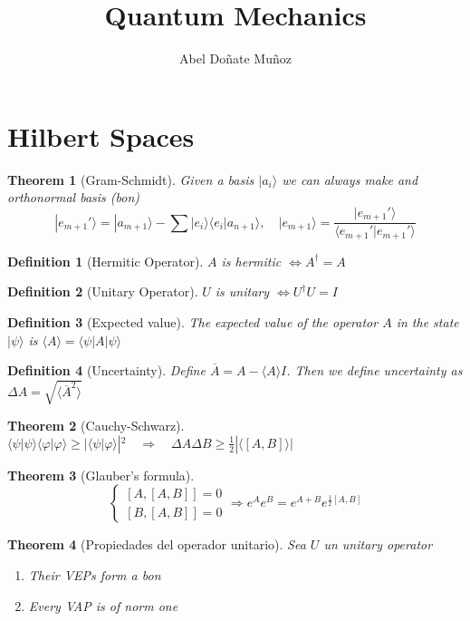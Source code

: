 \documentclass[leqno]{article}
\title{Quantum Mechanics}
\author{Abel Doñate Muñoz}
\date{}
\newtheorem*{theorem}{Theorem}
\newtheorem*{definition}{Definition}
\begin{document}
\maketitle
\tableofcontents
\newpage

\section{Hilbert Spaces}
\begin{theorem}[Gram-Schmidt]
Given a basis $| a_i \rangle $ we can always make and orthonormal basis (bon)
\[
| e_{m+1}' \rangle = | a_{m+1} \rangle - \sum | e_i \rangle \langle e_i | a_{n+1} \rangle  , \quad | e_{m+1} \rangle = \frac{| e_{m+1}' \rangle }{\langle e_{m+1}' | e_{m+1}' \rangle } 
\] 
\end{theorem}

\begin{definition}[Hermitic Operator] $A$ is hermitic  $\iff A^\dagger = A	$
\end{definition}
\begin{definition}[Unitary Operator] $U$ is unitary  $\iff U^\dagger U = I$
\end{definition}
\begin{definition}[Expected value] The expected value of the operator $A$ in the state $| \psi \rangle $ is $\langle A \rangle = \langle \psi  | A | \psi  \rangle     $
\end{definition}
\begin{definition}[Uncertainty] Define $\overline{A}=A-\langle A  \rangle I $. Then we define uncertainty as $\Delta A = \sqrt{\langle \overline{A}^2 \rangle } $
\end{definition}
\begin{theorem}[Cauchy-Schwarz] $\langle \psi  | \psi  \rangle \langle \varphi   | \varphi  \rangle \ge |\langle \psi  | \varphi  \rangle |^2 \quad \Rightarrow \quad \Delta A \Delta B \ge \frac{1}{2} |\langle [A,B] \rangle |$ 
\end{theorem}
\begin{theorem}[Glauber's formula]
\[
\begin{cases}
  [A,[A,B]]=0\\
  [B,[A,B]]=0
\end{cases} \Rightarrow e^{A}e^{B} = e^{A+B}e^{\frac{1}{2}[A,B]}
\] 
\end{theorem}

\begin{theorem}[Propiedades del operador unitario] Sea $U$ un unitary operator
\begin{enumerate}[topsep=-6pt, itemsep=0pt]
  \item Their VEPs form a bon
  \item Every VAP is of norm one
\end{enumerate}
\end{theorem}
\end{document}
